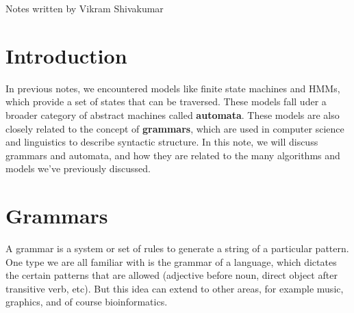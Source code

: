 \documentclass[12pt]{article}
\begin{document}
\thispagestyle{plain}
   \newpage
   \setcounter{page}{1}
   \noindent
   \begin{center}
   \end{center}
   {Notes written by Vikram Shivakumar}
   \vspace*{4mm}


\section{Introduction}
In previous notes, we encountered models like finite state machines and HMMs, which provide a set of states that can be traversed. These models fall uder a broader category of abstract machines called \textbf{automata}. These models are also closely related to the concept of \textbf{grammars}, which are used in computer science and linguistics to describe syntactic structure. In this note, we will discuss grammars and automata, and how they are related to the many algorithms and models we've previously discussed.
\section{Grammars}
A grammar is a system or set of rules to generate a string of a particular pattern. One type we are all familiar with is the grammar of a language, which dictates the certain patterns that are allowed (adjective before noun, direct object after transitive verb, etc). But this idea can extend to other areas, for example music, graphics, and of course bioinformatics.
\end{document}
